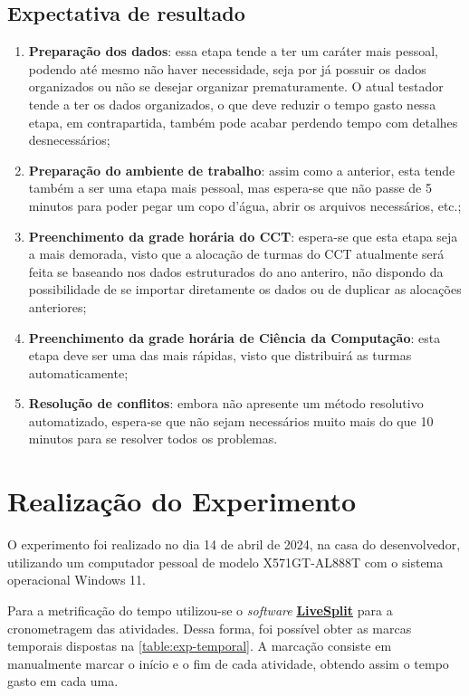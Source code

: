 \subsection{Expectativa de resultado}

\begin{enumerate}
  \item \textbf{Preparação dos dados}: essa etapa tende a ter um caráter mais pessoal, podendo até mesmo não haver necessidade, seja por já possuir os dados organizados ou não se desejar organizar prematuramente. O atual testador tende a ter os dados organizados, o que deve reduzir o tempo gasto nessa etapa, em contrapartida, também pode acabar perdendo tempo com detalhes desnecessários;
  \item \textbf{Preparação do ambiente de trabalho}: assim como a anterior, esta tende também a ser uma etapa mais pessoal, mas espera-se que não passe de 5 minutos para poder pegar um copo d'água, abrir os arquivos necessários, etc.;
  \item \textbf{Preenchimento da grade horária do CCT}: espera-se que esta etapa seja a mais demorada, visto que a alocação de turmas do CCT atualmente será feita se baseando nos dados estruturados do ano anteriro, não dispondo da possibilidade de se importar diretamente os dados ou de duplicar as alocações anteriores;
  \item \textbf{Preenchimento da grade horária de Ciência da Computação}: esta etapa deve ser uma das mais rápidas, visto que distribuirá as turmas automaticamente;
  \item \textbf{Resolução de conflitos}: embora não apresente um método resolutivo automatizado, espera-se que não sejam necessários muito mais do que 10 minutos para se resolver todos os problemas.
\end{enumerate}

\section{Realização do Experimento}

O experimento foi realizado no dia 14 de abril de 2024, na casa do desenvolvedor, utilizando um computador pessoal de modelo X571GT-AL888T com o sistema operacional Windows 11.

Para a metrificação do tempo utilizou-se o \textit{software} \href{https://livesplit.org/}{\textbf{LiveSplit}} para a cronometragem das atividades. Dessa forma, foi possível obter as marcas temporais dispostas na \autoref{table:exp-temporal}. A marcação consiste em manualmente marcar o início e o fim de cada atividade, obtendo assim o tempo gasto em cada uma.

